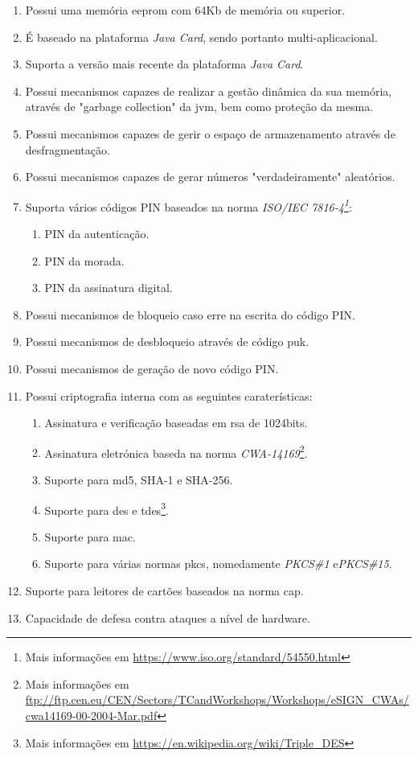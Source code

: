 \begin{enumerate}
    \item Possui uma memória \gls{eeprom} com 64Kb de memória ou superior.
    \item É baseado na plataforma \emph{Java Card}, sendo portanto multi-aplicacional.
    \item Suporta a versão mais recente da plataforma \emph{Java Card}.
    \item Possui mecanismos capazes de realizar a gestão dinâmica da sua memória, através de "garbage collection" da \gls{jvm}, bem como proteção da mesma.
    \item Possui mecanismos capazes de gerir o espaço de armazenamento através de desfragmentação.
    \item Possui mecanismos capazes de gerar números "verdadeiramente" aleatórios.
    \item Suporta vários códigos PIN baseados na norma \emph{ISO/IEC 7816-4\footnote{Mais informações em \url{https://www.iso.org/standard/54550.html}}}:
    \begin{enumerate}
        \item PIN da autenticação.
        \item PIN da morada.
        \item PIN da assinatura digital.
    \end{enumerate}
    \item Possui mecanismos de bloqueio caso erre na escrita do código PIN.
    \item Possui mecanismos de desbloqueio através de código \gls{puk}.
    \item Possui mecanismos de geração de novo código PIN.
    \item Possui criptografia interna com as seguintes caraterísticas:
    \begin{enumerate}
        \item Assinatura e verificação baseadas em \gls{rsa} de 1024bits.
        \item Assinatura eletrónica baseda na norma \emph{CWA-14169}\footnote{Mais informações em \url{ftp://ftp.cen.eu/CEN/Sectors/TCandWorkshops/Workshops/eSIGN_CWAs/cwa14169-00-2004-Mar.pdf}}.
        \item Suporte para \gls{md5}, SHA-1 e SHA-256.
        \item Suporte para \gls{des} e \gls{tdes}\footnote{Mais informações em \url{https://en.wikipedia.org/wiki/Triple_DES}}.
        \item Suporte para \gls{mac}.
        \item Suporte para várias normas \gls{pkcs}, nomedamente \emph{PKCS\#1} e\emph{PKCS\#15}.
    \end{enumerate}
    \item Suporte para leitores de cartões baseados na norma \gls{cap}.
    \item Capacidade de defesa contra ataques a nível de hardware.
\end{enumerate}

